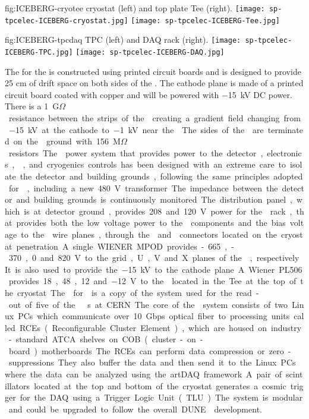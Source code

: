 \begin{dunefigure}
  {fig:ICEBERG-cryotee}
	{ cryostat (left) and top plate Tee (right).}
  \texttt{[image: sp-tpcelec-ICEBERG-cryostat.jpg]}
  \texttt{[image: sp-tpcelec-ICEBERG-Tee.jpg]}
\end{dunefigure}

\begin{dunefigure}
  {fig:ICEBERG-tpcdaq}
	{ TPC (left) and DAQ rack (right).}
  \texttt{[image: sp-tpcelec-ICEBERG-TPC.jpg]}
  \texttt{[image: sp-tpcelec-ICEBERG-DAQ.jpg]}
\end{dunefigure}

The  for the  is constructed using printed circuit boards and is 
designed to provide 25 cm of drift space on both sides of the . The cathode 
plane is made of a printed circuit board coated with copper and will be powered with 
\SI{-15}{kV} DC power. There is a \SI{1}{G$\Omega$} resistance between the strips of the 
creating a gradient field changing from \SI{-15}{kV} at the cathode to \SI{-1}{kV} near the 
. The sides of the  are terminated on the 
ground with \SI{156}{M$\Omega$} resistors. 

The  power system that provides power to the detector, electronics, 
, and cryogenics controls has been designed with an extreme care to 
isolate the detector and building grounds, following the same principles adopted
for , including a new 480~V transformer. The impedance between the detector
and building grounds is continuously monitored. The distribution panel, which is 
at detector ground, provides 208 and 120~V power for the  rack, that
provides both the low voltage power to the  components and the bias 
voltage to the  wire planes, through the  and 
connectors located on the cryostat penetration. A single WIENER MPOD  provides 
-665, -370, 0 and \SI{820}{V} to the grid, U, V and X planes of the ,
respectively. It is also used to provide the \SI{-15}{kV} to the cathode plane. A Wiener 
PL506 provides 18, 48, 12 and \SI{-12}{V} to the  located in the Tee at
the top of the cryostat. 

The  for  is a copy of the system used for the read-out
of five of the  s at CERN. The core of the  system 
consists of two Linux PCs which communicate over 10 Gbps optical fiber
to processing units called RCEs (Reconfigurable Cluster Element), which are 
housed on industry-standard ATCA shelves on COB (cluster-on-board) motherboards.
The RCEs can perform data compression or zero-suppressions. They also buffer
the data and then send it to the Linux PCs where the data can be analyzed 
using the artDAQ framework. A pair of scintillators located at the top and bottom 
of the cryostat generates a cosmic trigger for the DAQ  using a Trigger Logic Unit (TLU).
The system is modular and could be upgraded to follow the overall DUNE  
development. 

